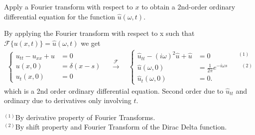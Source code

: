\documentclass[12pt]{article}
\newcommand{\F}{\mathcal{F}}
\newenvironment{subproblem}[2][Part]{\begin{trivlist}
  \item[\hskip \labelsep {\bfseries #1}\hskip \labelsep {\bfseries (#2)}]}{\end{trivlist}}
\newenvironment{solution}[1][Solution]{\begin{trivlist}
  \item[\hskip \labelsep {\bfseries #1} \hskip \labelsep]}{\end{trivlist}}
\theoremstyle{remark}
\begin{document}
\begin{subproblem}{a}
  Apply a Fourier transform with respect to \(x\) to obtain a 2nd-order ordinary differential
  equation for the function \(\hat{u}(\omega,t)\).
\end{subproblem}
\begin{solution}
  $ $\\
  By applying the Fourier transform with respect to x such that \(\F\{u(x,t)\} =
  \hat{u}(\omega,t)\) we get
  \begin{align*}
    \left\{
    \begin{array}{ll}
      u_{tt}-u_{xx} + u &= 0 \\
      u(x,0) &= \delta(x-s) \\
      u_t(x,0) &= 0
    \end{array}
                 \right.
                 \quad\xrightarrow{\F}\quad
                 \left\{
                 \begin{array}{ll}
                   \hat{u}_{tt} - (i\omega)^2\hat{u} + \hat{u} &= 0 \qquad\qquad^{(1)}\\
                   \hat{u}(\omega,0) &= \frac{1}{2\pi}e^{-i\omega s} \qquad^{(2)}\\
                   \hat{u}_t(\omega,0) &= 0.
                 \end{array}
                                         \right.
  \end{align*}
  which is a 2nd order ordinary differential equation. Second order due to \(\hat{u}_{tt}\)
  and ordinary due to derivatives only involving \(t\). \\
  $ $ \\
  \begin{footnotesize}
    \(^{(1)}\)By derivative property of Fourier Transforms. \\
    \(^{(2)}\)By shift property and Fourier Transform of the Dirac Delta function.
  \end{footnotesize}
\end{solution}
\end{document}
